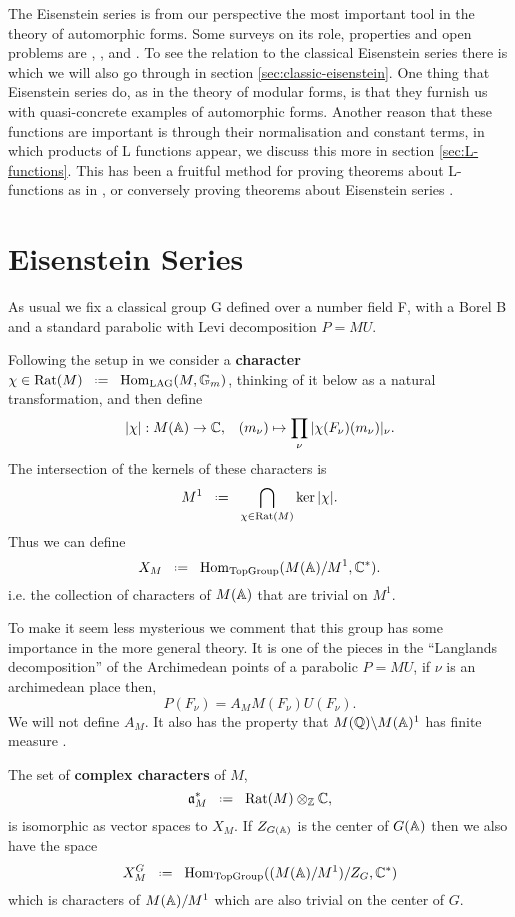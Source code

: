 The Eisenstein series is from our perspective the most important tool in the theory of automorphic forms. Some surveys on its role, properties and open problems are \cite{lapidPerspectivesEisensteinSeries2022}, \cite{arthurEisensteinSeriesTrace1979}, \cite{kimEISENSTEINSERIESTHEIR} and \cite{jiangResiduesEisensteinSeries2008a}. To see the relation to the classical Eisenstein series there is \cite{garrettTransitionEisensteinSeries2016} which we will also go through in section \ref{sec:classic-eisenstein}. One thing that Eisenstein series do, as in the theory of modular forms, is that they furnish us with quasi-concrete examples of automorphic forms. Another reason that these functions are important is through their normalisation and constant terms, in which products of L functions appear, we discuss this more in section \ref{sec:L-functions}. This has been a fruitful method for proving theorems about L-functions as in \cite{shahidiEisensteinSeriesAutomorphic2010}\cite{pollackRANKINSELBERGMETHODUSER}\cite{arthurEisensteinSeriesTrace1979}, or conversely proving theorems about Eisenstein series \cite{jiangPolesCertainResidual2013}.

\section{Eisenstein Series}\label{sec:eisenstein-series}
As usual we fix a classical group G defined over a number field F, with a Borel B and a standard parabolic with Levi decomposition \(P = MU\). 

Following the setup in \cite[I.1.4]{moeglinSpectralDecompositionEisenstein1995} we consider a \textbf{character} \(\chi\in \mathrm{Rat}(M) \defeq \Hom_{\mathrm{LAG}}(M, \mathbb{G}_m)\), thinking of it below as a natural transformation, and then define 
\[|\chi|: M(\A)\to \C , \;\;\; (m_\nu)\mapsto \prod_\nu|\chi(F_\nu)(m_\nu)|_\nu.\]
The intersection of the kernels of these characters is 
\[M^1 \defeq \bigcap_{\chi\in \mathrm{Rat}(M)}\ker |\chi|.\]
Thus we can define
\[X_M \defeq \Hom_{\textrm{TopGroup}}(M(\A)/M^1, \C^*) .\]
i.e. the collection of characters of \(M(\A)\) that are trivial on \(M^1\).
\begin{remark}
    To make it seem less mysterious we comment that this group has some importance in the more general theory. It is one of the pieces in the ``Langlands decomposition'' of the Archimedean points of a parabolic \(P = MU\), if \(\nu\) is an archimedean place then,
    \[P(F_\nu) = A_M M(F_\nu)U(F_\nu).\]
    We will not define \(A_M\).
    It also has the property that \(M(\Q)\backslash M(\A)^1\) has finite measure \cite[4.9]{getzIntroductionAutomorphicRepresentations2024}.
\end{remark}
The set of \textbf{complex characters} of \(M\),
\[\mathfrak{a}_M^* \defeq \mathrm{Rat}(M)\tensor_\Z \C,\]
is isomorphic as \C vector spaces to \(X_M\). If \(Z_{G(\A)}\) is the center of \(G(\A)\) then we also have the space 
\[X_M^G \defeq \Hom_{\textrm{TopGroup}}((M(\A)/M^1)/Z_G, \C^*)\]
which is characters of \(M(\A)/M^1\) which are also trivial on the center of \(G\).

